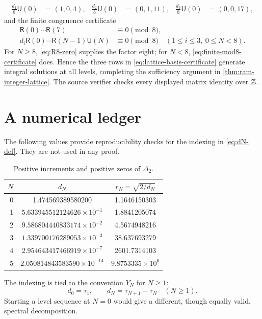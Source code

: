 \begin{align}
 \frac{d_1}{8}\mathsf U(0)&=(1,0,4),&
 \frac{d_2}{8}\mathsf U(0)&=(0,1,11),&
 \frac{d_3}{8}\mathsf U(0)&=(0,0,17),
 \label{eq:lattice-basis-certificate}
\end{align}
and the finite congruence certificate
\begin{align}
 \mathsf R(0)\cdots\mathsf R(7)&\equiv0\pmod8,
 \label{eq:R8-zero}\\
 d_i\mathsf R(0)\cdots\mathsf R(N-1)\mathsf U(N)&\equiv0\pmod8
 \quad(1\le i\le3,\ 0\le N<8).
 \label{eq:finite-mod8-certificate}
\end{align}
For \(N\ge8\), \eqref{eq:R8-zero} supplies the factor eight; for
\(N<8\), \eqref{eq:finite-mod8-certificate} does.  Hence the three rows in
\eqref{eq:lattice-basis-certificate} generate integral solutions at all
levels, completing the sufficiency argument in
\cref{thm:ram-integer-lattice}.  The source verifier checks every displayed
matrix identity over \(\mathbb Z\).

\section{A numerical ledger}
\label{app:numerics}

The following values provide reproducibility checks for the indexing in
\eqref{eq:dN-def}.  They are not used in any proof.

\begin{table}[ht]
\centering
\caption{Positive increments and positive zeros of \(\Delta_2\).}
\begin{tabular}{@{}rcc@{}}
\toprule
\(N\)&\(d_N\)&\(r_N=\sqrt{2/d_N}\)\\
\midrule
0&1.474569389580200&1.1646150303\\
1&\(5.633945512124626\times10^{-1}\)&1.8841205074\\
2&\(9.586804440833174\times10^{-2}\)&4.5674948216\\
3&\(1.339700176289053\times10^{-3}\)&38.637693279\\
4&\(2.954643417466919\times10^{-7}\)&2601.7314103\\
5&\(2.050814843583590\times10^{-14}\)&\(9.8753335\times10^6\)\\
\bottomrule
\end{tabular}
\end{table}

The indexing is tied to the convention \(Y_N\) for \(N\ge1\):
\[
 d_0=\tau_1,\qquad d_N=\tau_{N+1}-\tau_N\quad(N\ge1).
\]
Starting a level sequence at \(N=0\) would give a different, though equally
valid, spectral decomposition.
